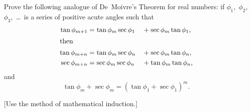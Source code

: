 Prove the following analogue of De~Moivre's Theorem for real
numbers: if $\phi_{1}$,~$\phi_{2}$, $\phi_{3}$,~\dots\ is a series of positive acute angles such that
\begin{alignat*}{2}
\tan\phi_{m+1} &= \tan\phi_{m} \sec\phi_{1} &&+ \sec\phi_{m} \tan\phi_{1},\\
\intertext{then}
\tan\phi_{m+n} &= \tan\phi_{m} \sec\phi_{n} &&+ \sec\phi_{m} \tan\phi_{n},\\
\sec\phi_{m+n} &= \sec\phi_{m} \sec\phi_{n} &&+ \tan\phi_{m} \tan\phi_{n},
\end{alignat*}
and
\[
\tan\phi_{m} + \sec\phi_{m} = (\tan\phi_{1} + \sec\phi_{1})^{m}.
\]

[Use the method of mathematical induction.]

